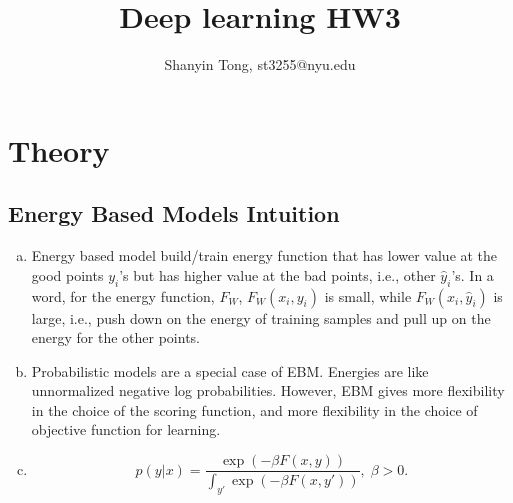 \documentclass[10pt,a4paper]{article}
\theoremstyle{dotlessP}
\begin{document}
\title{Deep learning HW3}
\author{Shanyin Tong, st3255@nyu.edu}

\maketitle

\section{Theory}

\subsection{Energy Based Models Intuition}
\begin{enumerate}[(a)]
	\item Energy based model build/train energy function that has lower value at the good points $y_i$'s but has higher value at the bad points, i.e., other $\hat{y}_i$'s. In a word, for the energy function, $F_W$, $F_W(x_i, y_i)$ is small, while $F_W(x_i, \hat{y}_i)$ is large, i.e., push down on the energy of training samples and pull up on the energy for the other points.
	\item Probabilistic models are a special case of EBM. Energies are like unnormalized negative log probabilities. However, EBM gives more flexibility in the choice of the scoring function, and more flexibility in the choice of objective function for learning.
	\item \begin{equation}
	p(y|x) =\frac{\exp(-\beta F(x,y))}{\int_{y'}\exp(-\beta F(x,y'))}, \; \beta >0.
	\end{equation}
\end{enumerate}
\end{document}
